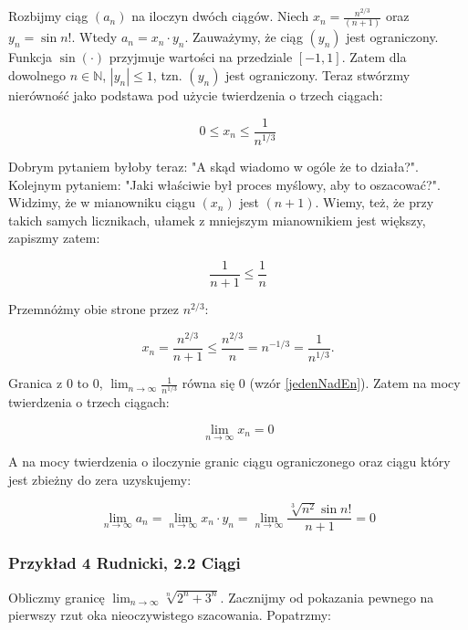 \documentclass[a4paper,oneside,openright,11pt]{article}
\numberwithin{equation}{section}
\begin{document}
Rozbijmy ciąg $(a_n)$ na iloczyn dwóch ciągów. Niech $x_n = \frac{n^{2/3}}{(n+1)}$ oraz $y_n = \sin n!$. Wtedy $a_n = x_n \cdot y_n$. Zauważymy, że ciąg $(y_n)$ jest ograniczony.
Funkcja $\sin(\cdot)$ przyjmuje wartości na przedziale $[-1, 1]$. Zatem dla dowolnego $n \in \mathbb{N}$, $|y_n| \leq 1$, tzn. $(y_n)$ jest ograniczony. Teraz stwórzmy nierówność jako podstawa pod użycie
twierdzenia o trzech ciągach:

\begin{equation*}
    0 \leq x_n \leq \frac{1}{n^{1/3}}
\end{equation*}

Dobrym pytaniem byłoby teraz: "A skąd wiadomo w ogóle że to działa?". Kolejnym pytaniem: "Jaki właściwie był proces myślowy, aby to oszacować?". Widzimy, że w mianowniku ciągu $(x_n)$ jest $(n+1)$.
Wiemy, też, że przy takich samych licznikach, ułamek z mniejszym mianownikiem jest większy, zapiszmy zatem:

\begin{equation*}
    \frac{1}{n+1} \leq \frac{1}{n}
\end{equation*}

Przemnóżmy obie strone przez $n^{2/3}$:

\begin{equation*}
    x_n = \frac{n^{2/3}}{n+1} \leq \frac{n^{2/3}}{n} = n^{-1/3} = \frac{1}{n^{1/3}}.
\end{equation*}

Granica z $0$ to $0$, $\lim_{n\to\infty} \frac{1}{n^{1/3}}$ równa się $0$ (wzór \ref{jedenNadEn}). Zatem na mocy twierdzenia o trzech ciągach:

\begin{equation*}
    \lim_{n\to\infty} x_n = 0
\end{equation*}

\noindent
A na mocy twierdzenia o iloczynie granic ciągu ograniczonego oraz ciągu który jest zbieżny do zera uzyskujemy:

\begin{equation*}
    \lim_{n\to\infty} a_n = \lim_{n\to\infty} x_n \cdot y_n =\lim_{n\to\infty} \frac{\sqrt[3]{n^2} \sin n!}{n+1} = 0
\end{equation*}


\subsubsection{Przykład 4 Rudnicki, 2.2 Ciągi}


Obliczmy granicę $\lim_{n\to\infty} \sqrt[n]{2^{n} + 3^n}$. Zacznijmy od pokazania pewnego na pierwszy rzut oka nieoczywistego szacowania. Popatrzmy:
\end{document}
